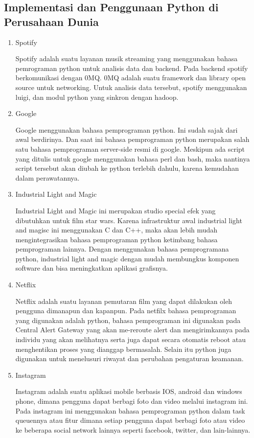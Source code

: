 \subsection{Implementasi dan Penggunaan Python di Perusahaan Dunia}
\begin{enumerate}
\item Spotify 
\par
Spotify adalah suatu layanan musik streaming yang menggunakan bahasa pemrograman python untuk analisis data dan backend. Pada backend spotify berkomunikasi dengan 0MQ. 0MQ adalah suatu framework dan library open source untuk networking. Untuk analisis data tersebut, spotify menggunakan luigi, dan modul python yang sinkron dengan hadoop.
\item Google
\par 
Google menggunakan bahasa pemprograman python. Ini sudah sajak dari awal berdirinya. Dan saat ini bahasa pemprograman python merupakan salah satu bahasa pemprograman server-side resmi di google. Meskipun ada script yang ditulis untuk google menggunakan bahasa perl dan bash, maka nantinya script tersebut akan diubah ke python terlebih dahulu, karena kemudahan dalam perawatannya.
\item Industrial Light and Magic
\par 
Industrial Light and Magic ini merupakan studio special efek yang dibutuhkan untuk film star wars. Karena infrastruktur awal industrial light and magisc ini menggunakan C dan C++, maka akan lebih mudah mengintegrasikan bahasa pemprograman python ketimbang bahasa pemprograman lainnya. Dengan menggunakan bahasa pemprogramana python, industrial light and magic dengan mudah membungkus komponen software dan bisa meningkatkan aplikasi grafisnya.
\item Netflix
\par 
Netflix adalah suatu layanan pemutaran film yang dapat dilakukan oleh pengguna dimanapun dan kapanpun. Pada netfilx bahasa pemprograman yang digunakan adalah python, bahasa pemprograman ini digunakan pada Central Alert Gateway yang akan me-reroute alert dan mengirimkannya pada individu yang akan melihatnya serta juga  dapat secara otomatis reboot atau menghentikan proses yang dianggap bermasalah. Selain itu python juga digunakan untuk menelusuri riwayat dan perubahan pengaturan keamanan.
\item Instagram 
\par 
Instagram adalah suatu aplikasi mobile berbasis IOS, android dan windows phone, dimana pengguna dapat berbagi foto dan video melalui instagram ini. Pada instagram ini menggunakan bahasa pemprograman python dalam task queuennya atau fitur dimana setiap pengguna dapat berbagi foto atau video ke beberapa social network lainnya seperti facebook, twitter, dan lain-lainnya.

\end{enumerate}
